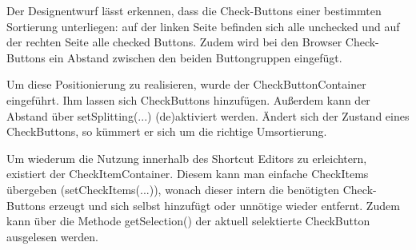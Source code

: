 Der Designentwurf lässt erkennen, dass die Check-Buttons einer bestimmten Sortierung unterliegen: auf der linken Seite befinden sich alle unchecked und auf der rechten Seite alle checked Buttons. Zudem wird bei den Browser Check-Buttons ein Abstand zwischen den beiden Buttongruppen eingefügt. 

Um diese Positionierung zu realisieren, wurde der CheckButtonContainer eingeführt. Ihm lassen sich CheckButtons hinzufügen. Außerdem kann der Abstand über setSplitting(...) (de)aktiviert werden. Ändert sich der Zustand eines CheckButtons, so kümmert er sich um die richtige Umsortierung.

Um wiederum die Nutzung innerhalb des Shortcut Editors zu erleichtern, existiert der CheckItemContainer. Diesem kann man einfache CheckItems übergeben (setCheckItems(...)), wonach dieser intern die benötigten Check-Buttons erzeugt und sich selbst hinzufügt oder unnötige wieder entfernt. Zudem kann über die Methode getSelection() der aktuell selektierte CheckButton ausgelesen werden.
\newpage